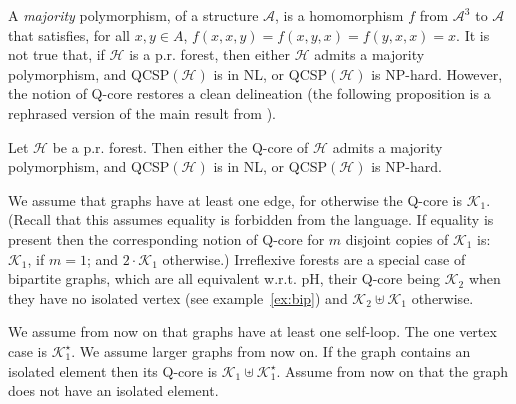 \documentclass{LMCS}
\begin{document}
A \emph{majority} polymorphism, of a structure $\mathcal{A}$, is a homomorphism $f$ from $\mathcal{A}^3$ to $\mathcal{A}$ that satisfies, for all $x,y \in A$, $f(x,x,y)=f(x,y,x)=f(y,x,x)=x$.
It is not true that, if $\mathcal{H}$ is a \mbox{p.r.} forest, then either $\mathcal{H}$ admits a majority polymorphism, and QCSP$(\mathcal{H})$ is in NL, or QCSP$(\mathcal{H})$ is NP-hard. However, the notion of Q-core restores a clean delineation (the following proposition is a rephrased version of the main result from \cite{QCSPforests}).
\begin{prop}
Let $\mathcal{H}$ be a \mbox{p.r.} forest. Then either the Q-core of $\mathcal{H}$ admits a majority polymorphism, and QCSP$(\mathcal{H})$ is in NL, or QCSP$(\mathcal{H})$ is NP-hard.
\end{prop}
\proof
  We assume that graphs have at least one edge, for otherwise the Q-core is
  $\mathcal{K}_1$. (Recall that this assumes equality is forbidden from the language. If equality is present then the corresponding notion of Q-core for $m$ disjoint copies of $\mathcal{K}_1$ is: $\mathcal{K}_1$, if $m=1$; and $2\cdot \mathcal{K}_1$ otherwise.)
  Irreflexive forests are a special case of bipartite graphs, which are
  all equivalent \mbox{w.r.t.} pH, their Q-core being $\mathcal{K}_2$ when
  they have no isolated vertex (see
  example~\ref{ex:bip}) and $\mathcal{K}_2 \uplus \mathcal{K}_1$ otherwise.

  We assume from now on that graphs have at least one
  self-loop.
  The one vertex case is $\mathcal{K}_1^\star$. We assume larger graphs from now
  on. If the graph contains an isolated element then its Q-core is $\mathcal{K}_1 \uplus \mathcal{K}_1^\star$.
  Assume from now on that the graph does not have an isolated element.
\end{document}
